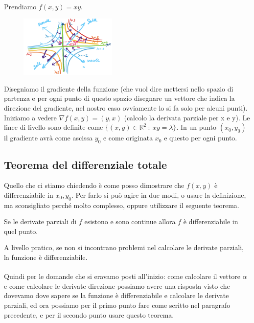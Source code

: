 \begin{example}
Prendiamo $f(x,y) = xy$.
\end{example}
\begin{figure}
    \vspace{-10pt}
    \centering
    \includegraphics[width=4.8cm]{images/ess-gradiane-2.png}
\end{figure}
Disegniamo il gradiente della funzione (che vuol dire mettersi nello spazio di partenza e per ogni punto di questo spazio disegnare un vettore che indica la direzione del gradiente, nel nostro caso ovviamente lo si fa solo per alcuni punti). \\
Iniziamo a vedere $\nabla f(x,y) = (y,x)$ (calcolo la derivata parziale per x e y). Le linee di livello sono definite come $\{(x,y)\in \mathbb{R}^2 \::\: xy = \lambda\}$. In un punto $(x_0,y_0)$ il gradiente avrà come ascissa $y_0$ e come originata $x_0$ e questo per ogni punto. 


\subsection{Teorema del differenziale totale}
Quello che ci stiamo chiedendo è come posso dimostrare che $f(x,y)$ è differenziabile in $x_0,y_0$. Per farlo si può agire in due modi, o usare la definizione, ma sconsigliato perché molto complesso, oppure utilizzare il seguente teorema.

\begin{theorem}
Se le derivate parziali di $f$ esistono e sono continue allora $f$ è differenziabile in quel punto.
\end{theorem}
\hspace{-15pt}A livello pratico, se non si incontrano problemi nel calcolare le derivate parziali, la funzione è differenziabile.\\\\
Quindi per le domande che si eravamo posti all'inizio: come calcolare il vettore $\alpha$ e come calcolare le derivate direzione possiamo avere una risposta visto che dovevamo dove sapere se la funzione è differenziabile e calcolare le derivate parziali, ed ora possiamo per il primo punto fare come scritto nel paragrafo precedente, e per il secondo punto usare questo teorema.

